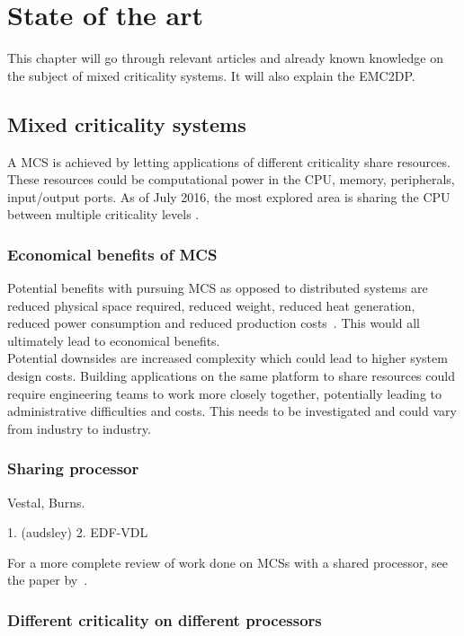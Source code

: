 \chapter{State of the art}
This chapter will go through relevant articles and already known knowledge on the subject of mixed criticality systems. It will also explain the EMC2DP.

\section{Mixed criticality systems}
A MCS is achieved by letting applications of different criticality share resources. These resources could be computational power in the CPU, memory, peripherals, input/output ports. As of July 2016, the most explored area is sharing the CPU between multiple criticality levels \cite{burns2016}. \\

\subsection{Economical benefits of MCS}
Potential benefits with pursuing MCS as opposed to distributed systems are reduced physical space required, reduced weight, reduced heat generation, reduced power consumption and reduced production costs~\cite{burns2016}. This would all ultimately lead to economical benefits.\\

Potential downsides are increased complexity which could lead to higher system design costs. Building applications on the same platform to share resources could require engineering teams to work more closely together, potentially leading to administrative difficulties and costs. This needs to be investigated and could vary from industry to industry.

\subsection{Sharing processor}
Vestal, Burns.

1. (audsley) 2. EDF-VDL

For a more complete review of work done on MCSs with a shared processor, see the paper by~\cite{burns2016}.

\subsection{Different criticality on different processors}


